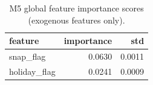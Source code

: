 \begin{table}
\caption{M5 global feature importance scores (exogenous features only).}
\label{tab:02_m5_global_exog_importance}
\begin{tabular}{lrr}
\toprule
feature & importance & std \\
\midrule
snap_flag & 0.0630 & 0.0011 \\
holiday_flag & 0.0241 & 0.0009 \\
\bottomrule
\end{tabular}
\end{table}
